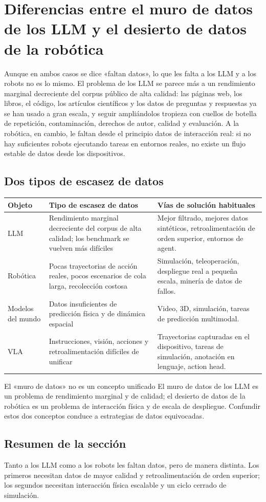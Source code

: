 \section{Diferencias entre el muro de datos de los LLM y el desierto de datos de la robótica}

Aunque en ambos casos se dice «faltan datos», lo que les falta a los LLM y a los robots no es lo mismo. El problema de los LLM se parece más a un rendimiento marginal decreciente del corpus público de alta calidad: las páginas web, los libros, el código, los artículos científicos y los datos de preguntas y respuestas ya se han usado a gran escala, y seguir ampliándolos tropieza con cuellos de botella de repetición, contaminación, derechos de autor, calidad y evaluación. A la robótica, en cambio, le faltan desde el principio datos de interacción real: si no hay suficientes robots ejecutando tareas en entornos reales, no existe un flujo estable de datos desde los dispositivos.

\subsection{Dos tipos de escasez de datos}

\noindent\begin{longtable}{p{}p{}p{}}
\toprule
Objeto & Tipo de escasez de datos & Vías de solución habituales \\
\midrule
LLM & Rendimiento marginal decreciente del corpus de alta calidad; los benchmark se vuelven más difíciles & Mejor filtrado, mejores datos sintéticos, retroalimentación de orden superior, entornos de agent. \\
Robótica & Pocas trayectorias de acción reales, pocos escenarios de cola larga, recolección costosa & Simulación, teleoperación, despliegue real a pequeña escala, minería de datos de fallos. \\
Modelos del mundo & Datos insuficientes de predicción física y de dinámica espacial & Video, 3D, simulación, tareas de predicción multimodal. \\
VLA & Instrucciones, visión, acciones y retroalimentación difíciles de unificar & Trayectorias capturadas en el dispositivo, tareas de simulación, anotación en lenguaje, action head. \\
\bottomrule
\end{longtable}

\begin{importantbox}{El «muro de datos» no es un concepto unificado}
El muro de datos de los LLM es un problema de rendimiento marginal y de calidad; el desierto de datos de la robótica es un problema de interacción física y de escala de despliegue. Confundir estos dos conceptos conduce a estrategias de datos equivocadas.
\end{importantbox}

\subsection{Resumen de la sección}

Tanto a los LLM como a los robots les faltan datos, pero de manera distinta. Los primeros necesitan datos de mayor calidad y retroalimentación de orden superior; los segundos necesitan interacción física escalable y un ciclo cerrado de simulación.

